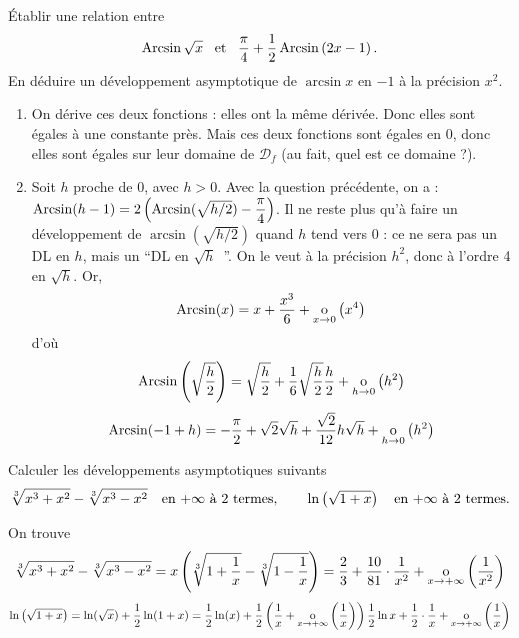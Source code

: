 \documentclass{magnolia}
\begin{document}
\begin{questions}
\question Établir une relation entre
  $$\operatorname{Arcsin}\sqrt{x} \quad\!\text{et}\quad\! \frac{\pi}{4}+\frac{1}{2}\operatorname{Arcsin}\left(2x-1\right).$$
\question En déduire un développement asymptotique de $\arcsin x$ en $-1$
  à la précision $x^2$.
\end{questions}
\begin{sol}
\begin{enumerate}
\item On dérive ces deux fonctions : elles ont la même dérivée. Donc elles sont égales à une constante près. Mais ces deux fonctions sont égales en 0, donc elles sont égales sur leur domaine de $\mathcal{D}_f$ (au fait, quel est ce domaine ?).
\item Soit $h$ proche de 0, avec $h>0$. Avec la question précédente, on a : $\operatorname{Arcsin}(h-1)=2\left(\operatorname{Arcsin}(\sqrt{h/2})-\dfrac\pi4\right)$. Il ne reste plus qu'à faire un développement de $\arcsin(\sqrt{h/2})$ quand $h$ tend vers 0 : ce ne sera pas un DL en $h$, mais un ``DL en $\sqrt h$\ ''. On le veut à la précision $h^2$, donc à l'ordre 4 en $\sqrt h$.
Or, $$\operatorname{Arcsin}(x)=x+\frac{x^3}{6}+\underset{x \rightarrow 0}{\text{o}}\left(x^4\right)$$ d'où $$\operatorname{Arcsin}\left(\sqrt{\frac{h}{2}}\right)=\sqrt{\frac{h}{2}}+\frac{1}{6}\sqrt{\frac{h}{2}}\frac{h}{2}+\underset{h \rightarrow 0}{\text{o}}\left(h^2\right)$$
\[\operatorname{Arcsin}(-1+h)=-\frac{\pi}{2}+\sqrt{2}\sqrt{h}+\frac{\sqrt{2}}{12}h\sqrt{h}+
  \underset{h \rightarrow 0}{\text{o}}\left(h^2\right)\]
\end{enumerate}

\end{sol}


Calculer les développements asymptotiques suivants
\[\sqrt[3]{x^3+x^2}-\sqrt[3]{x^3-x^2} \quad\text{en $+\infty$ à 2 termes},
  \qquad \ln\left(\sqrt{1+x}\right) \quad\text{en $+\infty$ à 2 termes}.\]
\begin{sol}
On trouve
\[\sqrt[3]{x^3+x^2}-\sqrt[3]{x^3-x^2}=x\left(\sqrt[3]{1+\frac1x}-\sqrt[3]{1-\frac1x}\right)=\frac{2}{3}+\frac{10}{81}\cdot\frac{1}{x^2}
  +\underset{x \rightarrow +\infty}{\text{o}}\left(\frac{1}{x^2}\right)\]
\[\ln\left(\sqrt{1+x}\right)=\ln(\sqrt{x})+\frac{1}{2}\ln(1+x)=\frac{1}{2}\ln(x)+\frac{1}{2}\left(\frac{1}{x}+\underset{x \rightarrow +\infty}{\text{o}}\left(\frac{1}{x}\right)\right)\frac{1}{2}\ln x+\frac{1}{2}\cdot\frac{1}{x}
  +\underset{x \rightarrow +\infty}{\text{o}}\left(\frac{1}{x}\right)\]
\end{sol}


\end{document}
